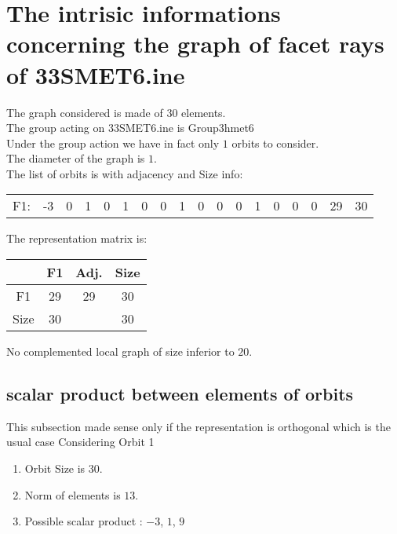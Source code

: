 \documentclass[12pt]{article}
\begin{document}
\section{The intrisic informations concerning the graph of facet rays of 33SMET6.ine}
The graph considered is made of $30$ elements.\\
The group acting on 33SMET6.ine is Group3hmet6\\
Under the group action we have in fact only $1$ orbits to consider.\\
The diameter of the graph is $1$.\\
The list of orbits is with adjacency and Size info:
\begin{center}
\scriptsize
\begin{tabular}{cccccccccccccccc|c|c}
F1:&-3&0&1&0&1&0&0&1&0&0&0&1&0&0&0&29&30\\
\end{tabular}
\end{center}
The representation matrix is:
\begin{center}
\scriptsize
\begin{tabular}{|c|c|c|c|}
\hline
&F1&Adj.&Size\\
\hline
F1& 29&29&30\\
\hline
Size&30&&30\\
\hline
\end{tabular}
\end{center}
No complemented local graph of size inferior to $20$.
\subsection{scalar product between elements of orbits}
\noindent This subsection made sense only if the representation is orthogonal which is the usual case
Considering Orbit 1
\begin{enumerate}
\item Orbit Size is $30$.
\item Norm of elements is $13$.
\item Possible scalar product : $-3$, $1$, $9$
\end{enumerate}
\end{document}

